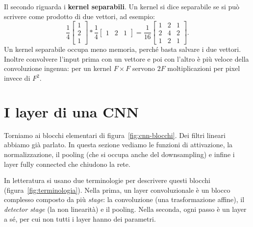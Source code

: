 Il secondo riguarda i \textbf{kernel separabili}. Un kernel si dice separabile se si può scrivere come prodotto di due vettori, ad esempio:
\[
\frac{1}{4}\begin{bmatrix} 1 \\ 2 \\ 1 \end{bmatrix} * \frac{1}{4}\begin{bmatrix} 1 & 2 & 1 \end{bmatrix} = \frac{1}{16}\begin{bmatrix} 1 & 2 & 1 \\ 2 & 4 & 2 \\ 1 & 2 & 1 \end{bmatrix}.
\]
Un kernel separabile occupa meno memoria, perché basta salvare i due vettori. Inoltre convolvere l'input prima con un vettore e poi con l'altro è più veloce della convoluzione ingenua: per un kernel $F \times F$ servono $2F$ moltiplicazioni per pixel invece di $F^2$.

\section{I layer di una CNN}\label{sec:cnn-layer}
Torniamo ai blocchi elementari di figura~\ref{fig:cnn-blocchi}. Dei filtri lineari abbiamo già parlato. In questa sezione vediamo le funzioni di attivazione, la normalizzazione, il pooling (che si occupa anche del downsampling) e infine i layer fully connected che chiudono la rete.

In letteratura si usano due terminologie per descrivere questi blocchi (figura~\ref{fig:terminologia}). Nella prima, un layer convoluzionale è un blocco complesso composto da più \emph{stage}: la convoluzione (una trasformazione affine), il \emph{detector stage} (la non linearità) e il pooling. Nella seconda, ogni passo è un layer a sé, per cui non tutti i layer hanno dei parametri.

